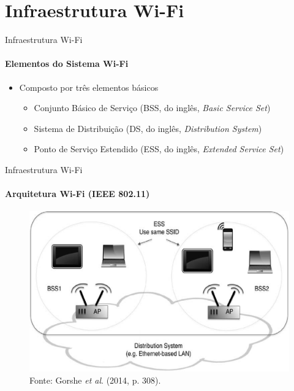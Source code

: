 \documentclass[aspectratio=169,12pt]{beamer}
\begin{document}
\section{Infraestrutura Wi-Fi}
\begin{frame}{Infraestrutura Wi-Fi}
	\framesubtitle{Elementos do Sistema Wi-Fi}
	\begin{itemize}
		\item Composto por três elementos básicos
		\begin{itemize}
			\item Conjunto Básico de Serviço (BSS, do inglês, \textit{Basic Service Set})
			\pause
			\item Sistema de Distribuição (DS, do inglês, \textit{Distribution System})
			\pause
			\item Ponto de Serviço Estendido (ESS, do inglês, \textit{Extended Service Set})
		\end{itemize}
	\end{itemize}
\end{frame}
\begin{frame}{Infraestrutura Wi-Fi}
	\framesubtitle{Arquitetura Wi-Fi (IEEE 802.11)}
	\begin{figure}[H]
		\centering
		\includegraphics[scale=.27]{fig_tcc/arquiteturas_802-11_01.pdf}
		\caption*{{\footnotesize Fonte: Gorshe \textit{et al}. (2014, p. 308).}}
	\end{figure}
\end{frame}
\end{document}
